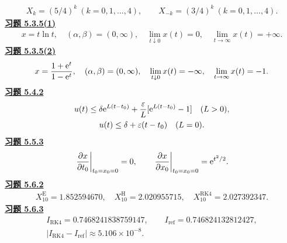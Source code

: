 \[\begin{gathered}X_k=(5/4)^k\ (k=0,1,\ldots,4),\qquad
 X_{-k}=(3/4)^k\ (k=0,1,\ldots,4).\end{gathered}\]
\noindent\textbf{\hyperref[q:5.3.5(1)]{习题 5.3.5(1)}}
\[\begin{gathered}x=t\ln t,\quad (\alpha,\beta)=(0,\infty),\quad
\lim_{t\downarrow0}x(t)=0,\quad\lim_{t\to\infty}x(t)=+\infty.\end{gathered}\]
\noindent\textbf{\hyperref[q:5.3.5(2)]{习题 5.3.5(2)}}
\[\begin{gathered}x=\dfrac{1+\mathrm e^t}{1-\mathrm e^t},\quad(\alpha,\beta)=(0,\infty),\quad
\lim_{t\downarrow0}x(t)=-\infty,\quad\lim_{t\to\infty}x(t)=-1.\end{gathered}\]
\noindent\textbf{\hyperref[q:5.4.2]{习题 5.4.2}}
\[\begin{gathered}u(t)\le\delta\mathrm e^{L(t-t_0)}+\dfrac\varepsilon L[\mathrm e^{L(t-t_0)}-1]\quad(L>0),\\
u(t)\le\delta+\varepsilon(t-t_0)\quad(L=0).\end{gathered}\]
\noindent\textbf{\hyperref[q:5.5.3]{习题 5.5.3}}
\[\begin{gathered}\left.\dfrac{\partial x}{\partial t_0}\right|_{t_0=x_0=0}=0,\qquad
\left.\dfrac{\partial x}{\partial x_0}\right|_{t_0=x_0=0}=\mathrm e^{t^2/2}.\end{gathered}\]
\noindent\textbf{\hyperref[q:5.6.2]{习题 5.6.2}}
\[\begin{gathered}X_{10}^{\mathrm E}=1.852594670,\quad X_{10}^{\mathrm H}=2.020955715,\quad X_{10}^{\mathrm {RK4}}=2.027392347.\end{gathered}\]
\noindent\textbf{\hyperref[q:5.6.3]{习题 5.6.3}}
\[\begin{gathered}I_{\mathrm{RK4}}=0.7468241838759147,\qquad I_{\mathrm{ref}}=0.746824132812427,\\ |I_{\mathrm{RK4}}-I_{\mathrm{ref}}|\approx 5.106\times10^{-8}.\end{gathered}\]
\endgroup